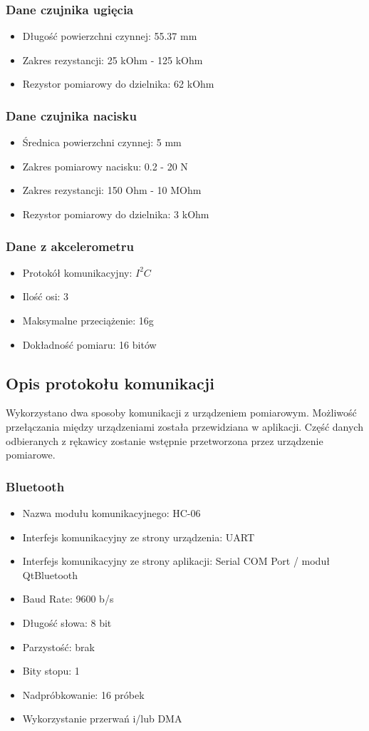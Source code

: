 \documentclass[12pt,a4paper]{article}
\begin{document}
\subsubsection{Dane czujnika ugięcia}
\begin{itemize}
\item Długość powierzchni czynnej: 55.37 mm
\item Zakres rezystancji: 25 kOhm - 125 kOhm
\item Rezystor pomiarowy do dzielnika: 62 kOhm
\end{itemize}
\subsubsection{Dane czujnika nacisku}
\begin{itemize}
\item Średnica powierzchni czynnej: 5 mm
\item Zakres pomiarowy nacisku: 0.2 - 20 N
\item Zakres rezystancji: 150 Ohm - 10 MOhm
\item Rezystor pomiarowy do dzielnika: 3 kOhm
\end{itemize}
\subsubsection{Dane z akcelerometru}
\begin{itemize}
\item Protokół komunikacyjny: $I^2C$
\item Ilość osi: 3
\item Maksymalne przeciążenie: 16g
\item Dokładność pomiaru: 16 bitów 
\end{itemize}

\subsection{Opis protokołu komunikacji}
Wykorzystano dwa sposoby komunikacji z urządzeniem pomiarowym. Możliwość przełączania między urządzeniami została przewidziana w aplikacji. Część danych odbieranych z rękawicy zostanie wstępnie przetworzona przez urządzenie pomiarowe.
\subsubsection{Bluetooth}
\begin{itemize}
\item Nazwa modułu komunikacyjnego: HC-06
\item Interfejs komunikacyjny ze strony urządzenia: UART
\item Interfejs komunikacyjny ze strony aplikacji: Serial COM Port / moduł QtBluetooth
\item Baud Rate: 9600 b/s
\item Długość słowa: 8 bit
\item Parzystość: brak
\item Bity stopu: 1
\item Nadpróbkowanie: 16 próbek
\item Wykorzystanie przerwań i/lub DMA
\end{itemize}
\end{document}
